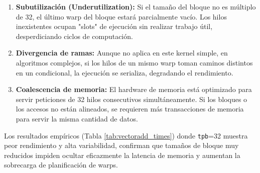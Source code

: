 \documentclass[12pt,a4paper]{report}
\begin{document}
\begin{enumerate}
    \item \textbf{Subutilización (Underutilization):} Si el tamaño del bloque no es múltiplo de 32, el último warp del bloque estará parcialmente vacío. Los hilos inexistentes ocupan "slots" de ejecución sin realizar trabajo útil, desperdiciando ciclos de computación.
    \item \textbf{Divergencia de ramas:} Aunque no aplica en este kernel simple, en algoritmos complejos, si los hilos de un mismo warp toman caminos distintos en un condicional, la ejecución se serializa, degradando el rendimiento.
    \item \textbf{Coalescencia de memoria:} El hardware de memoria está optimizado para servir peticiones de 32 hilos consecutivos simultáneamente. Si los bloques o los accesos no están alineados, se requieren más transacciones de memoria para servir la misma cantidad de datos.
\end{enumerate}

Los resultados empíricos (Tabla \ref{tab:vectoradd_times}) donde \texttt{tpb}=32 muestra peor rendimiento y alta variabilidad, confirman que tamaños de bloque muy reducidos impiden ocultar eficazmente la latencia de memoria y aumentan la sobrecarga de planificación de warps.
\end{document}
